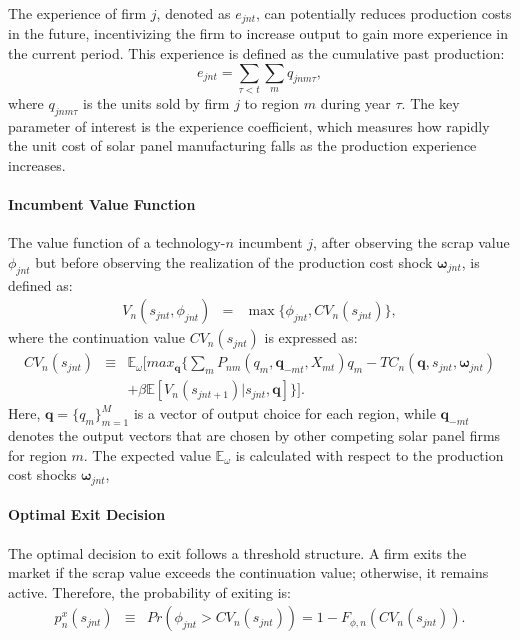 \documentclass[12pt]{article}
\begin{document}
The experience of firm $j$, denoted as $e_{jnt}$, can potentially reduces production costs in the future, incentivizing the firm to increase output to gain more experience in the current period.  This experience is defined as the cumulative past production:
\[e_{jnt} = \sum_{\tau<t} \sum_m q_{jnm\tau},\]
where $q_{jnm\tau}$ is the units sold by firm $j$ to region $m$ during year $\tau$. The key parameter of interest is the experience coefficient, which measures how rapidly the unit cost of solar panel manufacturing falls as the production experience increases. 

\paragraph{Incumbent Value Function}
The value function of a technology-$n$ incumbent $j$, after observing the scrap value $\phi_{jnt}$ but before observing the realization of the production cost shock $\boldsymbol{\omega}_{jnt}$, is defined as:
\begin{eqnarray}
V_n(s_{jnt},\phi_{jnt})&=&\max\{\phi_{jnt},CV_n(s_{jnt})\},  \label{eq:incumbent_value_fn} 
\end{eqnarray}
where the continuation value $CV_n(s_{jnt})$  is expressed as:
\begin{eqnarray}
CV_n(s_{jnt}) & \equiv & \mathbb{E}_{\omega}\Big[ max_{\boldsymbol{q}} \{\sum_m P_{nm}(q_{m}, \boldsymbol{q}_{-mt},X_{mt}) q_{m} - TC_{n}(\boldsymbol{q},s_{jnt},\boldsymbol{\omega}_{jnt})  \nonumber \\
&& +\beta \mathbb{E}[V_n(s_{jnt+1})|s_{jnt}, \boldsymbol{q}] \}\Big]. \label{eq:incumbent_EV_fn}
\end{eqnarray}
Here, $\boldsymbol{q} = \{q_m\}_{m=1}^M$ is a vector of output choice for each region, while $\boldsymbol{q}_{-mt}$ denotes the output vectors that are chosen by other competing solar panel firms for region $m$. The expected value $\mathbb{E}_{\omega}$ is calculated with respect to the production cost shocks $\boldsymbol{\omega}_{jnt}$, 

\paragraph{Optimal Exit Decision}
The optimal decision to exit follows a threshold structure. A firm exits the market if the scrap value exceeds the continuation value; otherwise, it remains active. Therefore, the probability of exiting is:
\begin{eqnarray}
    p_n^x(s_{jnt}) & \equiv & Pr\!\left(\phi_{jnt} > CV_n(s_{jnt})\right) = 1-F_{\phi,n}\!\left(CV_n(s_{jnt})\right). \label{eq:exit_policy_fn}
\end{eqnarray}
\end{document}
